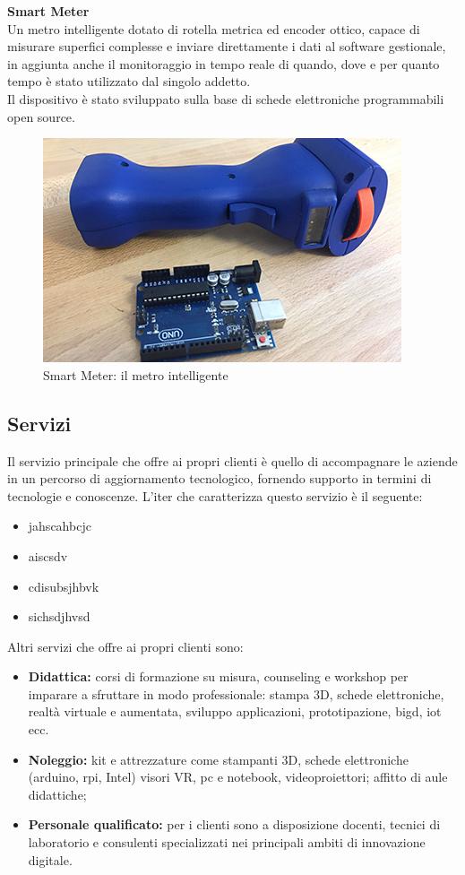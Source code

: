 \noindent \textbf{Smart Meter}
\\
Un metro intelligente dotato di rotella metrica ed encoder ottico, capace di misurare superfici complesse e inviare direttamente i dati al software gestionale, in aggiunta anche il monitoraggio in tempo reale di quando, dove e per quanto tempo è stato utilizzato dal singolo addetto.\\
Il dispositivo è stato sviluppato sulla base di schede elettroniche programmabili open source.
\\
\begin{figure}[H]
	\begin{center}
	\includegraphics[scale=0.6]{immagini/smartmeter.png}
	\caption{Smart Meter: il metro intelligente}
	\end{center}
\end{figure}

\subsection{Servizi}
Il servizio principale che \lab{} offre ai propri clienti è quello di accompagnare le aziende in un percorso di aggiornamento tecnologico, fornendo supporto in termini di tecnologie e conoscenze.
L'iter che caratterizza questo servizio è il seguente:
\begin{itemize}
\item jahscahbcjc
\item aiscsdv
\item cdisubsjhbvk
\item sichsdjhvsd
\end{itemize}
Altri servizi che \lab{} offre ai propri clienti sono:
\begin{itemize}
\item \textbf{Didattica:} corsi di formazione su misura, \gls{counseling} e \gls{workshop} per imparare a sfruttare in modo professionale: stampa 3D, schede elettroniche, realtà virtuale e aumentata, sviluppo applicazioni, prototipazione, \gls{bigd}, \gls{iot} ecc.
\item \textbf{Noleggio:} kit e attrezzature come stampanti 3D, schede elettroniche (\gls{arduino}, \gls{rpi}, Intel) visori VR, pc e notebook, videoproiettori; affitto di aule didattiche;
\item \textbf{Personale qualificato:} per i clienti sono a disposizione docenti, tecnici di laboratorio e consulenti specializzati nei principali ambiti di innovazione digitale.
\end{itemize}

